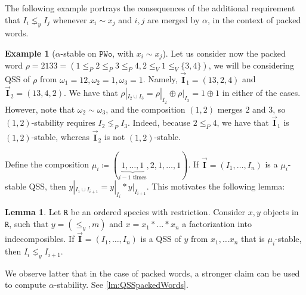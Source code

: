\documentclass[12pt, reqno]{amsart}
\theoremstyle{definition}
\newtheorem{lm}[thm]{Lemma}
\newtheorem{smpl}[thm]{Example}
\newcommand{\III}{\vec{\mathbf{I}}}
\begin{document}
The following example portrays the consequences of the additional requirement that $I_i \lneq_y I_j$ whenever $x_i \sim x_j$ and $i, j$ are merged by $\alpha$, in the context of packed words.

\begin{smpl}[$\alpha$-stable on $\mathtt{PWo}$, with $x_i \sim x_j$]
Let us consider now the packed word $\rho = 2133 = (1 \leq_P 2 \leq_P 3 \leq_P 4, 2 \leq_V 1 \leq_V \{3, 4\} )$, we will be considering QSS of $\rho$ from $\omega_1 = 12, \omega_2 = 1, \omega_3 = 1$.
Namely, $\III_1 = (13, 2, 4)$ and $\III_2 = (13, 4, 2)$.
We have that $\rho|_{I_2 \cup I_3} = \rho|_{I_2} \oplus \rho|_{I_3} = 1 \oplus 1$ in either of the cases.
However, note that $\omega_2 \sim \omega_3$, and the composition $(1, 2)$ merges $2$ and $3$, so $(1, 2)$-stability requires $I_2 \lneq_P I_3$.
Indeed, because $2 \leq_P 4$, we have that $\III_1$ is $(1, 2)$-stable, whereas $\III_2$ is not $(1, 2)$-stable.
\end{smpl}


Define the composition $\mu_i \coloneqq (\underbrace{1, \dots , 1}_\text{$i-1$ times}, 2, 1, \dots, 1)$.
If $\III = (I_1, \dots, I_n)$  is a $\mu_i$-stable QSS, then $y|_{I_1 \cup I_{i+1}} = y|_{I_i} \ast y|_{I_{i+1}}$.
This motivates the following lemma:

\begin{lm}\label{obs:pwords-characterisation}
Let $\mathtt{R}$ be an ordered species with restriction.
Consider $x, y$ objects in $\mathtt{R}$, such that $y = (\leq_y, m)$ and $x = x_1\ast \dots \ast x_n$ a factorization into indecomposibles.
If $\III = (I_1, \dots, I_n)$ is a QSS of $y$ from $x_1, \dots x_n$ that is $\mu_i$-stable, then $I_i \lneq_y I_{i+1}$.
\end{lm}


We observe latter that in the case of packed words, a stronger claim can be used to compute $\alpha$-stability.
See \cref{lm:QSSpackedWords}.
\end{document}

